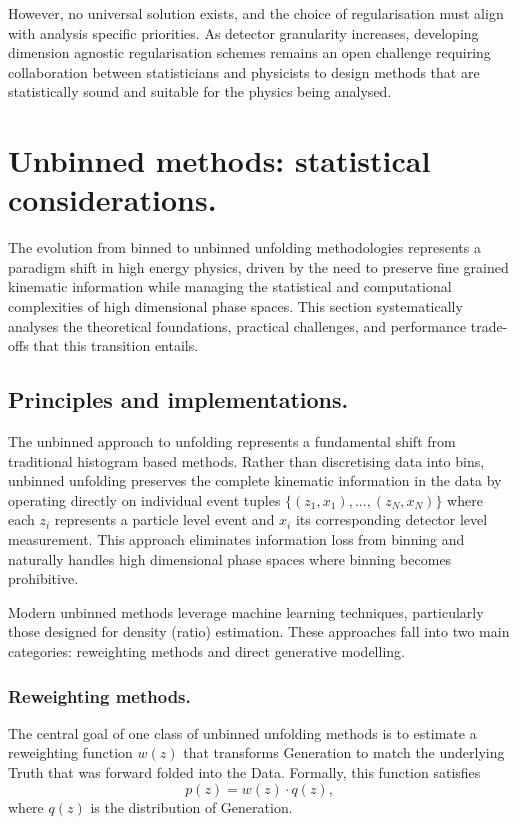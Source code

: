         However, no universal solution exists, and the choice of regularisation must align with analysis specific priorities.
        As detector granularity increases, developing dimension agnostic regularisation schemes remains an open challenge requiring collaboration between statisticians and physicists to design methods that are statistically sound and suitable for the physics being analysed.
        
\section{Unbinned methods: statistical considerations.}
\label{sec:theoretical-foundations.unbinned-methods}
\sectionminitoc
    The evolution from binned to unbinned unfolding methodologies represents a paradigm shift in high energy physics, driven by the need to preserve fine grained kinematic information while managing the statistical and computational complexities of high dimensional phase spaces.
    This section systematically analyses the theoretical foundations, practical challenges, and performance trade-offs that this transition entails.
    \subsection{Principles and implementations.}
        The unbinned approach to unfolding represents a fundamental shift from traditional histogram based methods.
        Rather than discretising data into bins, unbinned unfolding preserves the complete kinematic information in the data by operating directly on individual event tuples \(\{(z_1, x_1), ..., (z_N, x_N)\}\) where each \(z_i\) represents a particle level event and \(x_i\) its corresponding detector level measurement.
        This approach eliminates information loss from binning and naturally handles high dimensional phase spaces where binning becomes prohibitive.

        

        Modern unbinned methods leverage machine learning techniques, particularly those designed for density (ratio) estimation.
        These approaches fall into two main categories: reweighting methods and direct generative modelling.

        \subsubsection{Reweighting methods.}
        \label{subsubsec:principles-and-implementation.reweighting-based-methods}
            The central goal of one class of unbinned unfolding methods is to estimate a reweighting function \(w(z)\) that transforms Generation to match the underlying Truth that was forward folded into the Data.
            Formally, this function satisfies
            \begin{equation}
                p(z) = w(z) \cdot q(z),
            \end{equation}
            where \(q(z)\) is the distribution of Generation.
        

